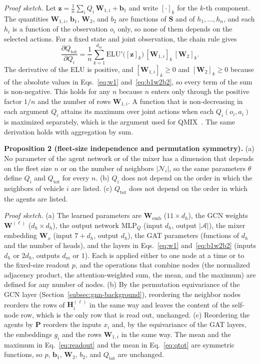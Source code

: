 \textit{Proof sketch.} Let $\mathbf{z} = \frac{1}{n}\sum_i Q_i\,\mathbf{W}_{1,i} + \mathbf{b}_1$
and write $[\cdot]_k$ for the $k$-th component. The quantities $\mathbf{W}_{1,i}$,
$\mathbf{b}_1$, $\mathbf{W}_2$, and $b_2$ are functions of $\mathbf{S}$ and of
$h_1,\dots,h_n$, and each $h_i$ is a function of the observation $o_i$ only, so none of them
depends on the selected actions. For a fixed state and joint observation, the chain rule
gives
\begin{equation}
\label{eq:dqtot}
\frac{\partial Q_{\text{tot}}}{\partial Q_i}
= \frac{1}{n}\sum_{k=1}^{d_m} \mathrm{ELU}'\big([\mathbf{z}]_k\big)\,[\mathbf{W}_{1,i}]_k\,[\mathbf{W}_2]_k .
\end{equation}
The derivative of the ELU is positive, and $[\mathbf{W}_{1,i}]_k\ge 0$ and
$[\mathbf{W}_2]_k\ge 0$ because of the absolute values in Eqs.~\eqref{eq:w1}
and~\eqref{eq:b1w2b2}, so every term of the sum is non-negative. This holds for any $n$
because $n$ enters only through the positive factor $1/n$ and the number of rows
$\mathbf{W}_{1,i}$. A function that is non-decreasing in each argument $Q_i$ attains its
maximum over joint actions when each $Q_i(o_i,a_i)$ is maximized separately, which is the
argument used for QMIX~\cite{qmix}. The same derivation holds with aggregation by sum.

\textbf{Proposition 2 (fleet-size independence and permutation symmetry).}
(a) No parameter of the agent network or of the mixer has a dimension that depends on the
fleet size $n$ or on the number of neighbors $|\mathcal{N}_i|$, so the same parameters
$\theta$ define $Q_i$ and $Q_{\text{tot}}$ for every $n$. (b) $Q_i$ does not depend on the
order in which the neighbors of vehicle $i$ are listed. (c) $Q_{\text{tot}}$ does not depend
on the order in which the agents are listed.

\textit{Proof sketch.} (a) The learned parameters are $\mathbf{W}_{\text{emb}}$
($11\times d_h$), the GCN weights $\mathbf{W}^{(\ell)}$ ($d_h\times d_h$), the output
network $\mathrm{MLP}_Q$ (input $d_h$, output $|\mathcal{A}|$), the mixer embedding
$\mathbf{W}_x$ (input $7+d_h$, output $d_h$), the GAT parameters (functions of $d_h$ and
the number of heads), and the layers in Eqs.~\eqref{eq:w1} and~\eqref{eq:b1w2b2} (inputs
$d_h$ or $2d_h$, outputs $d_m$ or $1$). Each is applied either to one node at a time or to
the fixed-size readout $p$, and the operations that combine nodes (the normalized adjacency
product, the attention-weighted sum, the mean, and the maximum) are defined for any number
of nodes. (b) By the permutation equivariance of the GCN layer
(Section~\ref{subsec:gnn-background}), reordering the neighbor nodes reorders the rows of
$\mathbf{H}_i^{(\ell)}$ in the same way and leaves the content of the self-node row, which is
the only row that is read out, unchanged. (c) Reordering the agents by
$\mathbf{P}$ reorders the inputs $x_i$ and, by the equivariance of the GAT layers, the
embeddings $g_i$ and the rows $\mathbf{W}_{1,i}$ in the same way. The mean and the maximum
in Eq.~\eqref{eq:readout} and the mean in Eq.~\eqref{eq:qtot} are symmetric functions, so
$p$, $\mathbf{b}_1$, $\mathbf{W}_2$, $b_2$, and $Q_{\text{tot}}$ are unchanged.

